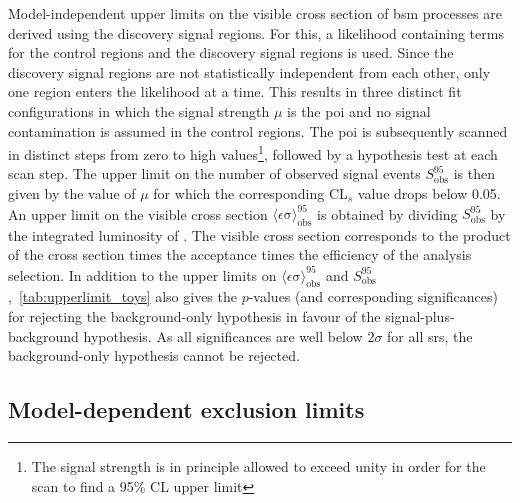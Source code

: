 Model-independent upper limits on the visible cross section of \gls{bsm} processes are derived using the discovery signal regions. For this, a likelihood containing terms for the control regions and the discovery signal regions is used. Since the discovery signal regions are not statistically independent from each other, only one region enters the likelihood at a time. This results in three distinct fit configurations in which the signal strength $\mu$ is the \gls{poi} and no signal contamination is assumed in the control regions. The \gls{poi} is subsequently scanned in distinct steps from zero to high values\footnote{The signal strength is in principle allowed to exceed unity in order for the scan to find a 95\% CL upper limit}, followed by a hypothesis test at each scan step. The upper limit on the number of observed signal events $S_{\mathrm{ obs}}^{95}$ is then given by the value of $\mu$ for which the corresponding CL$_s$ value drops below 0.05. An upper limit on the visible cross section $\langle\epsilon{\mathrm{ \sigma}}\rangle_{\mathrm{ obs}}^{95}$ is obtained by dividing $S_{\mathrm{ obs}}^{95}$ by the integrated luminosity of \onethirtynineifb. The visible cross section corresponds to the product of the cross section times the acceptance times the efficiency of the analysis selection. In addition to the upper limits on $\langle\epsilon{\mathrm{ \sigma}}\rangle_{\mathrm{ obs}}^{95}$ and $S_{\mathrm{ obs}}^{95}$,~\cref{tab:upperlimit_toys} also gives the $p$-values (and corresponding significances) for rejecting the background-only hypothesis in favour of the signal-plus-background hypothesis. As all significances are well below $2\sigma$ for all \glspl{sr}, the background-only hypothesis cannot be rejected.


\subsection{Model-dependent exclusion limits}\label{sec:model_independent_limits}

